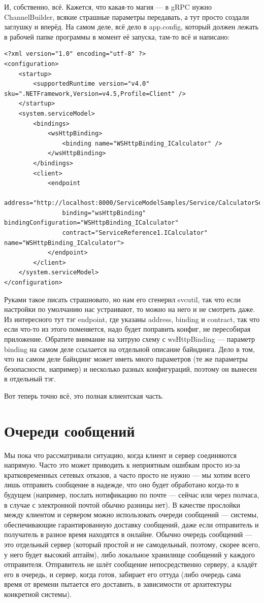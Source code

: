 \documentclass{../../text-style}
\begin{document}
И, собственно, всё. Кажется, что какая-то магия --- в gRPC нужно ChannelBuilder, всякие страшные параметры передавать, а тут просто создали заглушку и вперёд. На самом деле, всё дело в app.config, который должен лежать в рабочей папке программы в момент её запуска, там-то всё и написано: 

\begin{verbatim}
<?xml version="1.0" encoding="utf-8" ?>  
<configuration>  
    <startup>   
        <supportedRuntime version="v4.0" sku=".NETFramework,Version=v4.5,Profile=Client" />  
    </startup>  
    <system.serviceModel>  
        <bindings>  
            <wsHttpBinding>  
                <binding name="WSHttpBinding_ICalculator" />  
            </wsHttpBinding>  
        </bindings>  
        <client>  
            <endpoint 
                address="http://localhost:8000/ServiceModelSamples/Service/CalculatorService"  
                binding="wsHttpBinding" bindingConfiguration="WSHttpBinding_ICalculator"  
                contract="ServiceReference1.ICalculator" name="WSHttpBinding_ICalculator">  
            </endpoint>  
        </client>  
    </system.serviceModel>  
</configuration>
\end{verbatim}

Руками такое писать страшновато, но нам его сгенерил svcutil, так что если настройки по умолчанию нас устраивают, то можно на него и не смотреть даже. Из интересного тут тэг endpoint, где указаны address, binding и contract, так что если что-то из этого поменяется, надо будет поправить конфиг, не пересобирая приложение. Обратите внимание на хитрую схему с wsHttpBinding --- параметр binding на самом деле ссылается на отдельной описание байндинга. Дело в том, что на самом деле байндинг может иметь много параметров (те же параметры безопасности, например) и несколько разных конфигураций, поэтому он вынесен в отдельный тэг.

Вот теперь точно всё, это полная клиентская часть.

\section{Очереди сообщений}

Мы пока что рассматривали ситуацию, когда клиент и сервер соединяются напрямую. Часто это может приводить к неприятным ошибкам просто из-за кратковременных сетевых отказов, а часто просто не нужно --- мы хотим всего лишь отправить сообщение в надежде, что оно будет обработано когда-то в будущем (например, послать нотификацию по почте --- сейчас или через полчаса, в случае с электронной почтой обычно разницы нет). В качестве прослойки между клиентом и сервером можно использовать очереди сообщений --- системы, обеспечивающие гарантированную доставку сообщений, даже если отправитель и получатель в разное время находятся в онлайне. Обычно очередь сообщений --- это отдельный сервер (который простой и не самодельный, поэтому, скорее всего, у него будет высокий аптайм), либо локальное хранилище сообщений у каждого отправителя. Отправитель не шлёт сообщение непосредственно серверу, а кладёт его в очередь, и сервер, когда готов, забирает его оттуда (либо очередь сама время от времени пытается его доставить, в зависимости от архитектуры конкретной системы).
\end{document}
